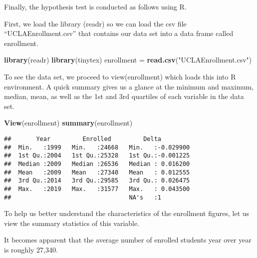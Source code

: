 \documentclass[
]{article}
\newenvironment{Shaded}{\begin{snugshade}}{\end{snugshade}}
\newcommand{\DataTypeTok}[1]{\textcolor[rgb]{0.13,0.29,0.53}{#1}}
\newcommand{\KeywordTok}[1]{\textcolor[rgb]{0.13,0.29,0.53}{\textbf{#1}}}
\newcommand{\NormalTok}[1]{#1}
\newcommand{\OperatorTok}[1]{\textcolor[rgb]{0.81,0.36,0.00}{\textbf{#1}}}
\newcommand{\OtherTok}[1]{\textcolor[rgb]{0.56,0.35,0.01}{#1}}
\newcommand{\StringTok}[1]{\textcolor[rgb]{0.31,0.60,0.02}{#1}}
\begin{document}
Finally, the hypothesis test is conducted as follows using R.

First, we load the library (readr) so we can load the csv file
``UCLAEnrollment.csv'' that contains our data set into a data frame
called enrollment.

\begin{Shaded}
\begin{Highlighting}[]
\KeywordTok{library}\NormalTok{(readr)}
\KeywordTok{library}\NormalTok{(tinytex)}
\NormalTok{enrollment =}\StringTok{ }\KeywordTok{read.csv}\NormalTok{(}\StringTok{"UCLAEnrollment.csv"}\NormalTok{)}
\end{Highlighting}
\end{Shaded}

To see the data set, we proceed to view(enrollment) which loads this
into R environment. A quick summary gives us a glance at the minimum and
maximum, median, mean, as well as the 1st and 3rd quartiles of each
variable in the data set.

\begin{Shaded}
\begin{Highlighting}[]
\KeywordTok{View}\NormalTok{(enrollment)}
\KeywordTok{summary}\NormalTok{(enrollment)}
\end{Highlighting}
\end{Shaded}

\begin{verbatim}
##       Year         Enrolled         Delta          
##  Min.   :1999   Min.   :24668   Min.   :-0.029900  
##  1st Qu.:2004   1st Qu.:25328   1st Qu.:-0.001225  
##  Median :2009   Median :26536   Median : 0.016200  
##  Mean   :2009   Mean   :27340   Mean   : 0.012555  
##  3rd Qu.:2014   3rd Qu.:29585   3rd Qu.: 0.026475  
##  Max.   :2019   Max.   :31577   Max.   : 0.043500  
##                                 NA's   :1
\end{verbatim}

To help us better understand the characteristics of the enrollment
figures, let us view the summary statistics of this variable.

It becomes apparent that the average number of enrolled students year
over year is roughly 27,340.

\begin{Shaded}
\end{Shaded}
\end{document}
